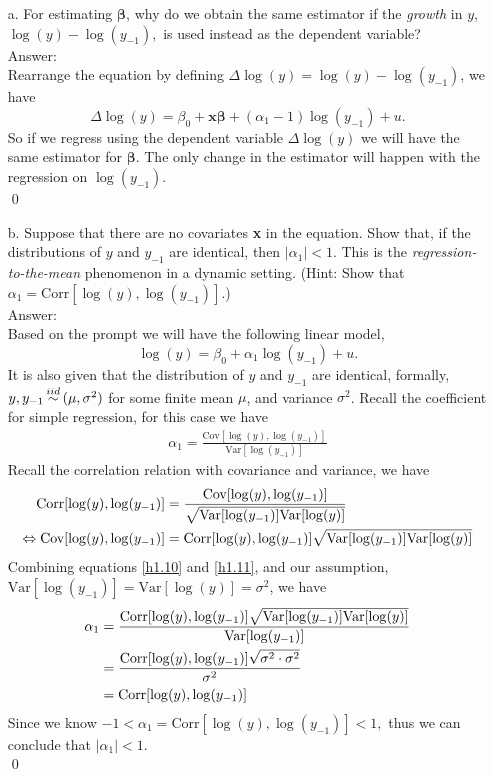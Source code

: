 \documentclass[10pt]{article}
\newcommand\iid{\stackrel{\mathclap{iid}}{\sim}}
\newcommand{\V}{\text{Var}}
\newcommand{\corr}{\text{Corr}}
\newcommand{\cov}{\text{Cov}}
\begin{document}
\begin{enumerate}
\item[a.] For estimating $\pmb{\beta}$, why do we obtain the same estimator if the \textit{growth} in $y$, $\log(y)-\log(y_{-1}),$ is used instead as the dependent variable?
\\ Answer: \\
Rearrange the equation by defining $\Delta \log(y)=\log(y)-\log(y_{-1})$, we have
\[\Delta \log(y)=\beta_0+\textbf{x}\pmb{\beta}+(\alpha_1-1)\log(y_{-1})+u.\]
So if we regress using the dependent variable $\Delta \log(y)$ we will have the same estimator for $\pmb{\beta}$. The only change in the estimator will happen with the regression on $\log(y_{-1}).$ \\ \qed

\item[b.] Suppose that there are no covariates \textbf{x} in the equation. Show that, if the distributions of $y$ and $y_{-1}$ are identical, then $|\alpha_1|<1$. This is the \textit{regression-to-the-mean}
phenomenon in a dynamic setting. (Hint: Show that $\alpha_1=\corr[\log(y),\log(y_{-1})].$)
\\ Answer: \\
Based on the prompt we will have the following linear model,
\[\log(y)=\beta_0+\alpha_1\log(y_{-1})+u.\]
It is also given that the distribution of $y$ and $y_{-1}$ are identical, formally, $y,y_{-1}\iid(\mu,\sigma^2)$ for some finite mean $\mu$, and variance $\sigma^2$. Recall the coefficient for simple regression, for this case we have
\begin{align}
    \alpha_1=\frac{\cov[\log(y),\log(y_{-1})]}{\V[\log(y_{-1})]}\label{h1.10}
\end{align}
Recall the correlation relation with covariance and variance, we have
\begin{align}
    \corr[\log(y),\log(y_{-1})]&=\frac{\cov[\log(y),\log(y_{-1})]}{\sqrt{\V[\log(y_{-1})]\V[\log(y)]}} \notag \\
    \Leftrightarrow \cov[\log(y),\log(y_{-1})]&= \corr[\log(y),\log(y_{-1})] \sqrt{\V[\log(y_{-1})]\V[\log(y)]}\label{h1.11}
\end{align}
Combining equations \eqref{h1.10} and \eqref{h1.11}, and our assumption, $\V[\log(y_{-1})]=\V[\log(y)]=\sigma^2$, we have
\begin{align}
    \alpha_1&=\frac{\corr[\log(y),\log(y_{-1})] \sqrt{\V[\log(y_{-1})]\V[\log(y)]}}{\V[\log(y_{-1})]} \notag \\
    &=\frac{\corr[\log(y),\log(y_{-1})] \sqrt{\sigma^2\cdot \sigma^2}}{\sigma^2} \notag \\
    &=\corr[\log(y),\log(y_{-1})]\notag
\end{align}
Since we know $-1< \alpha_1=\corr[\log(y),\log(y_{-1})]<1,$ thus we can conclude that $|\alpha_1|<1.$ \\ \qed
\end{enumerate}
\end{document}
